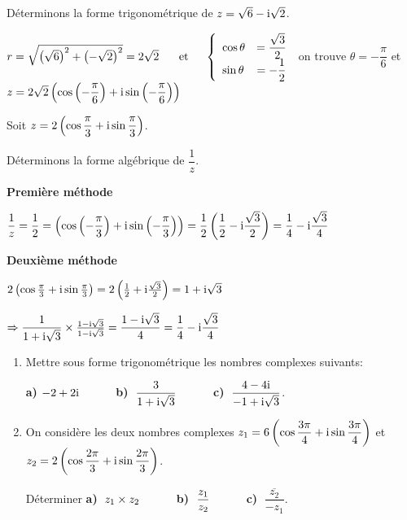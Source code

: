   \begin{example} Déterminons la forme trigonométrique  de $ z=\sqrt{6}-\text{i}\sqrt{2} $.
  
  \medskip
  $ r=\sqrt{\left(\sqrt{6}\right)^2+\left(-\sqrt{2}\right)^2}=2\sqrt{2}   \hspace*{0.5cm} \text{ et}  \hspace*{0.5cm}   \left\{\begin{array}{l c l}
\cos \theta & = \dfrac{\sqrt{3}}{2} \\	 
\sin \theta & =- \dfrac{1}{2}
\end{array}\right. $  on trouve $ \theta=-\dfrac{\pi}{6} $  et $ z=2\sqrt{2}\left(\cos \left(-\dfrac{\pi}{6}\right) +\text{i} \sin \left(-\dfrac{\pi}{6}\right)\right)$
   \end{example}
   \begin{example}
  Soit  $ z=2\left(\cos\dfrac{\pi}{3} +\text{i} \sin \dfrac{\pi}{3}\right)$.
  
   Déterminons la forme algébrique  de  $ \dfrac{1}{z} $.
  
  \medskip
  
  \textbf{Première méthode}
  
   \medskip
  $ \dfrac{1}{z} =\dfrac{1}{2}=\left(\cos \left(-\dfrac{\pi}{3}\right) +\text{i} \sin \left(-\dfrac{\pi}{3}\right)\right)=\dfrac{1}{2}\left(\dfrac{1}{2}-\text{i}\dfrac{\sqrt{3}}{2}\right)=\dfrac{1}{4}-\text{i}\dfrac{\sqrt{3}}{4}$
  
  \medskip
  
  \textbf{Deuxième méthode}
  
   \medskip
  $ 2\left(\cos\frac{\pi}{3} +\text{i} \sin \frac{\pi}{3}\right)=2\left(\frac{1}{2}+\text{i}\frac{\sqrt{3}}{2}\right)=1+\text{i}\sqrt{3}$
  
  
   \medskip
   $ \Rightarrow\dfrac{1}{1+\text{i}\sqrt{3}}\times\frac{1-\text{i}\sqrt{3}}{1-\text{i}\sqrt{3}} =\dfrac{1-\text{i}\sqrt{3}}{4}=\dfrac{1}{4}-\text{i}\dfrac{\sqrt{3}}{4}$
    \end{example}
\begin{exercice}
\begin{enumerate}
\item Mettre sous forme trigonométrique les nombres complexes suivants:


\medskip

\textbf{a)}\;  $ -2+2\text{i} \hspace*{1cm}$ \textbf{b)}  $\; \dfrac{3}{1+\text{i}\sqrt{3}}  \hspace*{1cm}$ \textbf{c)}  $\; \dfrac{4-4\text{i}}{-1+\text{i}\sqrt{3}} $.
\item  On considère les deux nombres complexes \; $ z_1=6\left(\cos\dfrac{3\pi}{4} +\text{i} \sin \dfrac{3\pi}{4}\right) $ et $ z_2=2\left(\cos\dfrac{2\pi}{3} +\text{i} \sin \dfrac{2\pi}{3}\right) $.

\bigskip

Déterminer   \textbf{a)}  $\; z_1\times z_2 \hspace*{1cm}$ \textbf{b)}  $\; \dfrac{z_1}{z_2} \hspace*{1cm}$  \textbf{c)}  $\; \dfrac{\overline{z_2}}{-z_1} $.
\end{enumerate}
\end{exercice}
